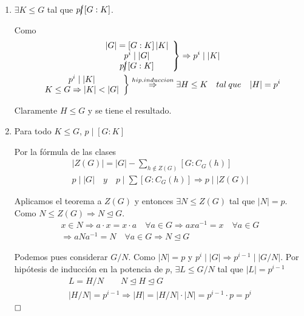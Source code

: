 \documentclass{article}
\begin{document}
\begin{enumerate}[C{a}so 1:]
\item $\exists K\leq G$ tal que $p\cancel{\mid}\left[G:K\right]$.

Como 
\begin{gather*}
\left.\begin{array}{c}
|G|=\left[G:K\right]|K| \\
p^i\mid |G|\\
p \cancel{\mid} \left[G:K\right]
\end{array} \right\rbrace \Rightarrow p^i\mid |K| \\
\left.\begin{array}{c}
p^i\mid |K| \\
K\leq G\Rightarrow |K|<|G|
\end{array} \right\rbrace \overset{hip.induccion}{\Rightarrow} \exists H\leq K\quad tal\:que\quad |H|=p^i
\end{gather*}

Claramente $H\leq G$ y se tiene el resultado. 

\item Para todo $K\leq G$, $p\mid \left[G:K\right]$

Por la fórmula de las clases
\begin{gather*}
|Z(G)|=|G|-\sum_{h\notin Z(G)}\left[G:C_G(h)\right] \\
p\mid |G| \quad y\quad p\mid \sum\left[G:C_G(h)\right]\Rightarrow p\mid |Z(G)|
\end{gather*}

Aplicamos el teorema a $Z(G)$ y entonces $\exists N\leq Z(G)$ tal que $|N|=p$. Como $N\leq Z(G)\Rightarrow N\unlhd G$.
\begin{gather*}
x\in N\Rightarrow a\cdot x=x\cdot a\quad \forall a\in G\Rightarrow axa^{-1}=x\quad \forall a\in G\\
\Rightarrow aNa^{-1}=N\quad \forall a\in G\Rightarrow N\unlhd G
\end{gather*}

Podemos pues considerar $G/N$. Como $|N|=p$ y $p^i\mid |G|\Rightarrow p^{i-1}\mid |G/N|$. Por hipótesis de inducción en la potencia de $p$, $\exists L\leq G/N$ tal que $|L|=p^{i-1}$
\begin{gather*}
L=H/N\qquad N\unlhd H\unlhd G \\
|H/N|=p^{i-1} \Rightarrow |H|=|H/N|\cdot |N|=p^{i-1}\cdot p=p^i
\end{gather*}
$\hfill\square$
\end{enumerate}
\end{document}
